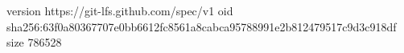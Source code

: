 version https://git-lfs.github.com/spec/v1
oid sha256:63f0a80367707e0bb6612fc8561a8cabca95788991e2b812479517c9d3c918df
size 786528
